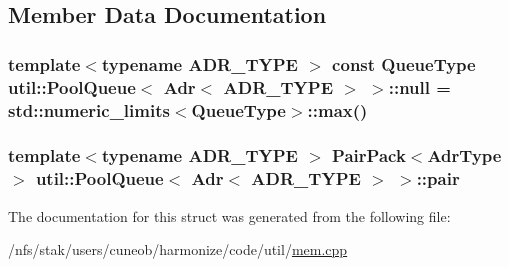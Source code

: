 \subsection{Member Data Documentation}
\hypertarget{structutil_1_1PoolQueue_3_01Adr_3_01ADR__TYPE_01_4_01_4_a53b042698b3c546222bbd78fb47a40d3}{
\subsubsection[{null}]{\setlength{\rightskip}{0pt plus 5cm}template$<$typename A\-D\-R\-\_\-\-T\-Y\-P\-E $>$ const {\bf Queue\-Type} {\bf util\-::\-Pool\-Queue}$<$ {\bf Adr}$<$ A\-D\-R\-\_\-\-T\-Y\-P\-E $>$ $>$\-::null = std\-::numeric\-\_\-limits$<${\bf Queue\-Type}$>$\-::max()\hspace{0.3cm}{\ttfamily [static]}}}\label{structutil_1_1PoolQueue_3_01Adr_3_01ADR__TYPE_01_4_01_4_a53b042698b3c546222bbd78fb47a40d3}
\hypertarget{structutil_1_1PoolQueue_3_01Adr_3_01ADR__TYPE_01_4_01_4_abe15b5174df1c89f696e304231683c92}{
\subsubsection[{pair}]{\setlength{\rightskip}{0pt plus 5cm}template$<$typename A\-D\-R\-\_\-\-T\-Y\-P\-E $>$ {\bf Pair\-Pack}$<${\bf Adr\-Type}$>$ {\bf util\-::\-Pool\-Queue}$<$ {\bf Adr}$<$ A\-D\-R\-\_\-\-T\-Y\-P\-E $>$ $>$\-::pair}}\label{structutil_1_1PoolQueue_3_01Adr_3_01ADR__TYPE_01_4_01_4_abe15b5174df1c89f696e304231683c92}


The documentation for this struct was generated from the following file\-:\begin{DoxyCompactItemize}
\item 
/nfs/stak/users/cuneob/harmonize/code/util/\hyperlink{mem_8cpp}{mem.\-cpp}\end{DoxyCompactItemize}
